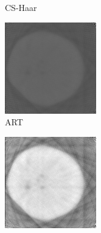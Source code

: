\documentclass[journal]{IEEEtran}
\begin{document}
\begin{figure}[!h]
\begin{subfigure}[b]{0.24\linewidth}
        \caption{CS-Haar}
     \end{subfigure}
    \begin{subfigure}[b]{0.24\linewidth}
        \includegraphics[width=\textwidth]{../images/potato/2D/art.png}
        \caption{ART}
     \end{subfigure}
    \begin{subfigure}[b]{0.24\linewidth}
        \includegraphics[width=\textwidth]{../images/potato/2D/sart.png}

\end{subfigure}
\end{figure}
\end{document}

